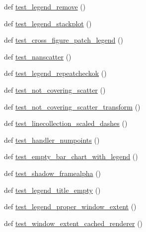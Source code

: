 \begin{DoxyCompactItemize}
\item 
def \hyperlink{namespacematplotlib_1_1tests_1_1test__legend_a5712cf60b016d2131c914086206f1183}{test\+\_\+legend\+\_\+remove} ()
\item 
def \hyperlink{namespacematplotlib_1_1tests_1_1test__legend_a43a82e58082daa84d4fc1334b59bcb76}{test\+\_\+legend\+\_\+stackplot} ()
\item 
def \hyperlink{namespacematplotlib_1_1tests_1_1test__legend_aefef58255d83f906b52fdffc8c5b1363}{test\+\_\+cross\+\_\+figure\+\_\+patch\+\_\+legend} ()
\item 
def \hyperlink{namespacematplotlib_1_1tests_1_1test__legend_af946c8a17eb1154e45f406001dd17fa2}{test\+\_\+nanscatter} ()
\item 
def \hyperlink{namespacematplotlib_1_1tests_1_1test__legend_a2fcaf91ac141946299e055eac8aa7ca6}{test\+\_\+legend\+\_\+repeatcheckok} ()
\item 
def \hyperlink{namespacematplotlib_1_1tests_1_1test__legend_a1e2639da1abdaf7c897a645962f8e153}{test\+\_\+not\+\_\+covering\+\_\+scatter} ()
\item 
def \hyperlink{namespacematplotlib_1_1tests_1_1test__legend_a845a4088680fe213570b8f877de5d3f5}{test\+\_\+not\+\_\+covering\+\_\+scatter\+\_\+transform} ()
\item 
def \hyperlink{namespacematplotlib_1_1tests_1_1test__legend_a4729099382b58b7e1bcc529a5063e555}{test\+\_\+linecollection\+\_\+scaled\+\_\+dashes} ()
\item 
def \hyperlink{namespacematplotlib_1_1tests_1_1test__legend_adb01666c9f8801ab3ecf3d749556dc23}{test\+\_\+handler\+\_\+numpoints} ()
\item 
def \hyperlink{namespacematplotlib_1_1tests_1_1test__legend_ae682afdbb62585ce2a73d682a7226a16}{test\+\_\+empty\+\_\+bar\+\_\+chart\+\_\+with\+\_\+legend} ()
\item 
def \hyperlink{namespacematplotlib_1_1tests_1_1test__legend_a5de387cf2738b5be354f05aec661a9ea}{test\+\_\+shadow\+\_\+framealpha} ()
\item 
def \hyperlink{namespacematplotlib_1_1tests_1_1test__legend_a92e452709c11e88a4a6cbbf9df772f43}{test\+\_\+legend\+\_\+title\+\_\+empty} ()
\item 
def \hyperlink{namespacematplotlib_1_1tests_1_1test__legend_a36d71a64687a736e6458d1b525285fe1}{test\+\_\+legend\+\_\+proper\+\_\+window\+\_\+extent} ()
\item 
def \hyperlink{namespacematplotlib_1_1tests_1_1test__legend_a56e3d90e6ef18c50774ce75f7848e513}{test\+\_\+window\+\_\+extent\+\_\+cached\+\_\+renderer} ()

\end{DoxyCompactItemize}
